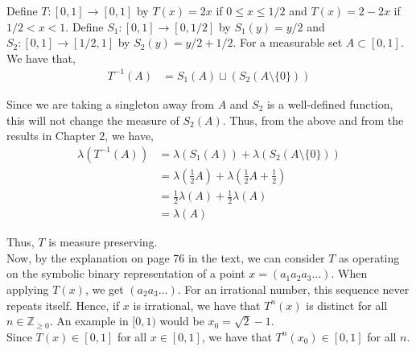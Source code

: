 \documentclass[12pt]{article}
\begin{document}
Define $T: [0, 1] \to [0,1]$ by $T(x) = 2x$ if $0 \leq x \leq 1/2$ and $T(x) = 2 - 2x$ if $1/2 < x < 1$. Define $S_1: [0, 1] \to [0, 1/2]$ by $S_1(y) = y/2$ and $S_2: [0, 1] \to [1/2, 1]$ by $S_2(y) = y/2 + 1/2$. For a measurable set $A \subset [0, 1]$. We have that,
\begin{align*}
T^{-1}(A) &= S_1(A) \sqcup (S_2(A \setminus \{0\}))
\end{align*}

Since we are taking a singleton away from $A$ and $S_2$ is a well-defined function, this will not change the measure of $S_2(A)$. Thus, from the above and from the results in Chapter 2, we have,
\begin{align*}
\lambda(T^{-1}(A)) &= \lambda(S_1(A)) + \lambda(S_2(A \setminus \{0\}))\\
&= \lambda(\frac{1}{2}A) + \lambda(\frac{1}{2}A + \frac{1}{2})\\
&= \frac{1}{2}\lambda(A) + \frac{1}{2}\lambda(A)\\
&= \lambda(A)
\end{align*}

Thus, $T$ is measure preserving.\\

Now, by the explanation on page 76 in the text, we can consider $T$ as operating on the symbolic binary representation of a point $x = (a_1a_2a_3\ldots)$. When applying $T(x)$, we get $(a_2a_3\ldots)$. For an irrational number, this sequence never repeats itself. Hence, if $x$ is irrational, we have that $T^n(x)$ is distinct for all $n \in \mathbb{Z}_{\geq 0}$. An example in $[0, 1)$ would be $x_0 = \sqrt{2} - 1$.\\

Since $T(x) \in [0, 1]$ for all $x \in [0, 1]$, we have that $T^n(x_0) \in [0, 1]$ for all $n$.
\end{document}
